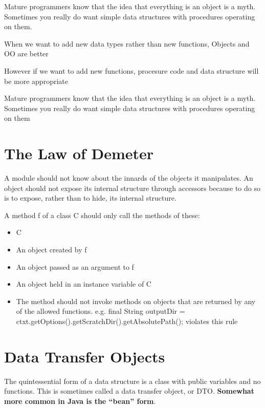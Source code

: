 Mature programmers know that the idea that everything is an object is a myth. Sometimes you really do want simple data structures with procedures operating on them.

\begin{marker}
When we want to add new data types rather than new functions, Objects and OO are better

However if we want to add new functions, procesure code and data structure will be more appropriate

Mature programmers know that the idea that everything is an object is a myth. Sometimes you really do want simple data structures with procedures operating on them
\end{marker}

\section{The Law of Demeter}

A module should not know about the innards of the objects it manipulates. An object should not expose its internal structure through accessors because to do so is to expose, rather than to hide, its internal structure.

\begin{tcolorbox}[breakable, colback=green!10!white, colframe=green!85!black, center title, title = Law of Demeter]
\begin{center}
A method f of a class C should only call the methods of these:

\begin{itemize}
    \item C
    \item An object created by f
    \item An object passed as an argument to f
    \item An object held in an instance variable of C
    \item The method should not invoke methods on objects that are returned by any of the allowed functions. e.g. final String outputDir = ctxt.getOptions().getScratchDir().getAbsolutePath(); violates this rule
\end{itemize}
\end{center}
\end{tcolorbox}

\section{Data Transfer Objects}

The quintessential form of a data structure is a class with public variables and no functions. This is sometimes called a data transfer object, or DTO. \textbf{Somewhat more common in Java is the “bean” form}.
